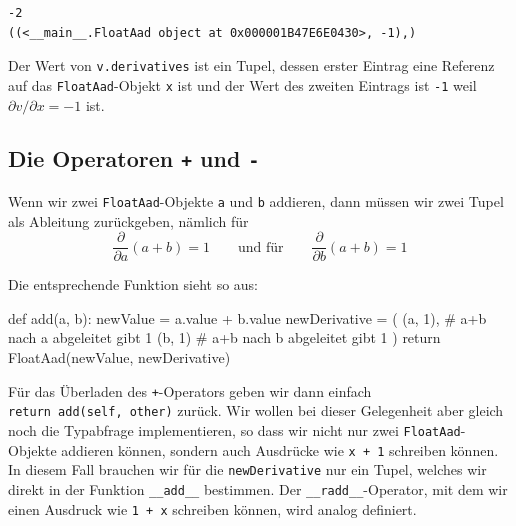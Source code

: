 \documentclass[
  a4paper,
  DIV=11]{scrreprt}
\newenvironment{Shaded}{\begin{snugshade}}{\end{snugshade}}
\newcommand{\CommentTok}[1]{\textcolor[rgb]{0.37,0.37,0.37}{#1}}
\newcommand{\ControlFlowTok}[1]{\textcolor[rgb]{0.00,0.23,0.31}{#1}}
\newcommand{\DecValTok}[1]{\textcolor[rgb]{0.68,0.00,0.00}{#1}}
\newcommand{\KeywordTok}[1]{\textcolor[rgb]{0.00,0.23,0.31}{#1}}
\newcommand{\NormalTok}[1]{\textcolor[rgb]{0.00,0.23,0.31}{#1}}
\newcommand{\OperatorTok}[1]{\textcolor[rgb]{0.37,0.37,0.37}{#1}}
\theoremstyle{definition}
\theoremstyle{definition}
\theoremstyle{remark}
\begin{document}
\begin{verbatim}
-2
((<__main__.FloatAad object at 0x000001B47E6E0430>, -1),)
\end{verbatim}

Der Wert von \texttt{v.derivatives} ist ein Tupel, dessen erster Eintrag
eine Referenz auf das \texttt{FloatAad}-Objekt \texttt{x} ist und der
Wert des zweiten Eintrags ist \texttt{-1} weil
\(\partial v / \partial x = -1\) ist.

\hypertarget{die-operatoren-und--}{%
\subsection{\texorpdfstring{Die Operatoren \texttt{+} und
\texttt{-}}{Die Operatoren + und -}}\label{die-operatoren-und--}}

Wenn wir zwei \texttt{FloatAad}-Objekte \texttt{a} und \texttt{b}
addieren, dann müssen wir zwei Tupel als Ableitung zurückgeben, nämlich
für \[
\frac{\partial}{\partial a}(a+b)=1 \qquad\textrm{und für}\qquad \frac{\partial}{\partial b}(a+b)=1
\]

Die entsprechende Funktion sieht so aus:

\begin{Shaded}
\begin{Highlighting}[]
\KeywordTok{def}\NormalTok{ add(a, b):}
\NormalTok{    newValue }\OperatorTok{=}\NormalTok{ a.value }\OperatorTok{+}\NormalTok{ b.value}
\NormalTok{    newDerivative }\OperatorTok{=}\NormalTok{ (}
\NormalTok{        (a, }\DecValTok{1}\NormalTok{),  }\CommentTok{\# a+b nach a abgeleitet gibt 1}
\NormalTok{        (b, }\DecValTok{1}\NormalTok{)   }\CommentTok{\# a+b nach b abgeleitet gibt 1}
\NormalTok{    )}
    \ControlFlowTok{return}\NormalTok{ FloatAad(newValue, newDerivative)}
\end{Highlighting}
\end{Shaded}

Für das Überladen des \texttt{+}-Operators geben wir dann einfach
\texttt{return\ add(self,\ other)} zurück. Wir wollen bei dieser
Gelegenheit aber gleich noch die Typabfrage implementieren, so dass wir
nicht nur zwei \texttt{FloatAad}-Objekte addieren können, sondern auch
Ausdrücke wie \texttt{x\ +\ 1} schreiben können. In diesem Fall brauchen
wir für die \texttt{newDerivative} nur ein Tupel, welches wir direkt in
der Funktion \texttt{\_\_add\_\_} bestimmen. Der
\texttt{\_\_radd\_\_}-Operator, mit dem wir einen Ausdruck wie
\texttt{1\ +\ x} schreiben können, wird analog definiert.
\end{document}
